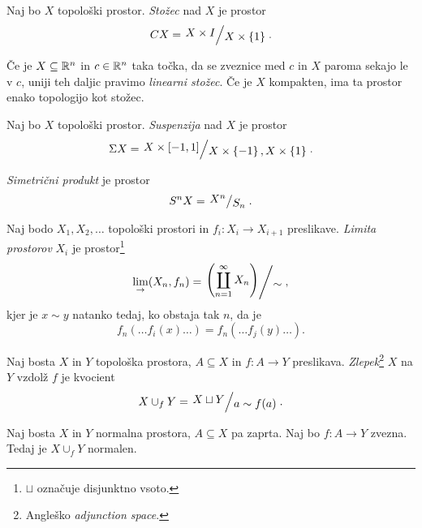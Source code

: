 
\begin{definicija}
Naj bo $X$ topološki prostor.
\emph{Stožec} nad $X$ je prostor
\[
CX = \kvoc{X \times I}{X \times \set{1}}.
\]
\end{definicija}

\begin{opomba}
Če je $X \subseteq \mathbb{R}^n$ in $c \in \mathbb{R}^n$ taka točka, da se zveznice
med $c$ in $X$ paroma sekajo le v $c$, uniji teh daljic pravimo
\emph{linearni stožec}. Če je $X$ kompakten, ima ta prostor enako
topologijo kot stožec.
\end{opomba}

\begin{definicija}
Naj bo $X$ topološki prostor.
\emph{Suspenzija} nad $X$ je
prostor
\[
\Sigma X =
\kvoc{X \times [-1, 1]}{X \times \set{-1}, X \times \set{1}}.
\]
\end{definicija}

\begin{definicija}
\emph{Simetrični produkt}
je prostor
\[
S^nX = \kvoc{X^n}{S_n}.
\]
\end{definicija}

\begin{definicija}
Naj bodo $X_1, X_2, \dots$ topološki prostori in
$f_i \colon X_i \to X_{i+1}$ preslikave.
\emph{Limita prostorov} $X_i$ je
prostor\footnote{$\sqcup$ označuje disjunktno vsoto.}
\[
\lim_{\to} (X_n, f_n) =
\kvoc{\left(\displaystyle\coprod_{n=1}^\infty X_n \right)}{\sim},
\]
kjer je $x \sim y$ natanko tedaj, ko obstaja tak $n$, da je
\[
f_n(\dots f_i(x) \dots) = f_n(\dots f_j(y) \dots).
\]
\end{definicija}

\begin{definicija}
Naj bosta $X$ in $Y$ topološka prostora, $A \subseteq X$ in
$f \colon A \to Y$ preslikava.
\emph{Zlepek}\footnote{Angleško
\emph{adjunction space}.} $X$ na $Y$ vzdolž $f$
je kvocient
\[
X \cup_f Y =
\kvoc{X \sqcup Y}{a \sim f(a)}.
\]
\end{definicija}

\begin{izrek}
Naj bosta $X$ in $Y$ normalna prostora, $A \subseteq X$ pa zaprta.
Naj bo $f \colon A \to Y$ zvezna. Tedaj je $X \cup_f Y$ normalen.
\end{izrek}

